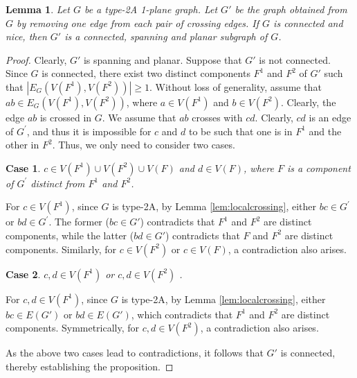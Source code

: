 \documentclass[12pt,a4paper]{article}
\newtheorem{lem}{Lemma}[section]
\newtheorem{case}{Case}
\begin{document}
\begin{lem}\label{lem:type3_preserves_connected}
Let $G$ be a type-2A 1-plane graph. Let $G'$ be the graph obtained from $G$ by removing one edge from each pair of crossing edges. If $G$ is connected and nice, then $G'$ is a connected, spanning and planar subgraph of $G$.
\end{lem}

\begin{proof}
 Clearly,  $G'$ is spanning and  planar.  Suppose that $G'$ is not connected.  Since $G$ is connected, there  exist two distinct components $F^1$ and $F^2$ of $G'$ such that  $|E_G(V(F^1),V(F^2))| \ge 1$. Without loss of generality, assume that $ab \in E_G(V(F^1),V(F^2))$, where $a \in V(F^1)$ and $b \in V(F^2)$. Clearly, the edge $a b$ is crossed in $G$. We assume that $a b$ crosses with $c d$. Clearly, $c d$ is an edge of $G^{\prime}$, and thus it is impossible for $c$ and $d$ to be such that one is in $F^1$ and the other in $F^2$. Thus, we only need to consider two cases.



\begin{case} 
$c \in V(F^1)\cup V(F^2) \cup V(F)$  and $d \in V(F)$, where $F$ is a component of $G^{\prime}$ distinct from $F^1$ and $F^2$.
\end{case} 

For $c \in V(F^1)$, since $G$ is type-2A, by Lemma \ref{lem:localcrossing},  either $b c \in G^{\prime}$ or $b d \in G^{\prime}$.  The former ($b c \in G'$) contradicts that $F^1$ and $F^2$ are  distinct components, while the latter ($b d \in G'$) contradicts that $F$ and $F^2$ are  distinct components.  
Similarly, for  $c \in V(F^2)$ or $c\in V(F)$, a contradiction also arises.
 
 

\begin{case} 
 $c,d \in V(F^1)$ or  $c,d \in V(F^2)$ .  
\end{case} 
For $c,d \in V(F^1)$, since $G$ is type-2A,  by Lemma \ref{lem:localcrossing},  either $b c \in E(G')$ or $b d \in E(G')$, which contradicts that $F^1$ and $F^2$ are  distinct components.   Symmetrically, for $c,d \in V(F^2)$, a contradiction also arises. 

As the above two cases lead to contradictions, it follows that $G'$ is connected, thereby establishing the proposition.
\end{proof}

%
\end{document}
